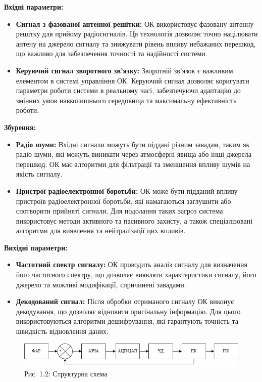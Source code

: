 \documentclass[a4paper]{article}
\begin{document}
\textbf{Вхідні параметри:}


\begin{itemize}
    \item \textbf{Сигнал з фазованої антенної решітки:} ОК використовує фазовану антенну решітку для прийому радіосигналів. Ця технологія дозволяє точно націлювати антену на джерело сигналу та знижувати рівень впливу небажаних перешкод, що важливо для забезпечення точності та надійності системи.
    \item \textbf{Керуючий сигнал зворотного зв'язку:} Зворотній зв'язок є важливим елементом в системі управління ОК. Керуючий сигнал дозволяє коригувати параметри роботи системи в реальному часі, забезпечуючи адаптацію до змінних умов навколишнього середовища та максимальну ефективність роботи.
\end{itemize}

\textbf{Збурення:}

\begin{itemize}
    \item \textbf{Радіо шуми:} Вхідні сигнали можуть бути піддані різним завадам, таким як радіо шуми, які можуть виникати через атмосферні явища або інші джерела перешкод. ОК має алгоритми для фільтрації та зменшення впливу шумів на якість сигналу.
    \item \textbf{Пристрої радіоелектронної боротьби:} ОК може бути підданий впливу пристроїв радіоелектронної боротьби, які намагаються заглушити або спотворити прийняті сигнали. Для подолання таких загроз система використовує методи активного та пасивного захисту, а також спеціалізовані алгоритми для виявлення та нейтралізації цих впливів.
\end{itemize}

\textbf{Вихідні параметри:}

\begin{itemize}
    \item \textbf{Частотний спектр сигналу:} ОК проводить аналіз сигналу для визначення його частотного спектру, що дозволяє виявляти характеристики сигналу, його джерело та можливі модифікації, спричинені завадами.
    \item \textbf{Декодований сигнал:} Після обробки отриманого сигналу ОК виконує декодування, що дозволяє відновити оригінальну інформацію. Для цього використовуються алгоритми дешифрування, які гарантують точність та швидкість відновлення даних.
\end{itemize}

\begin{figure}[h]
    \centering
    \includegraphics[width=1\textwidth]{imgs/PW1.2.png}
    \caption*{Рис. 1.2: Структурна схема}
\end{figure} 
\end{document}
